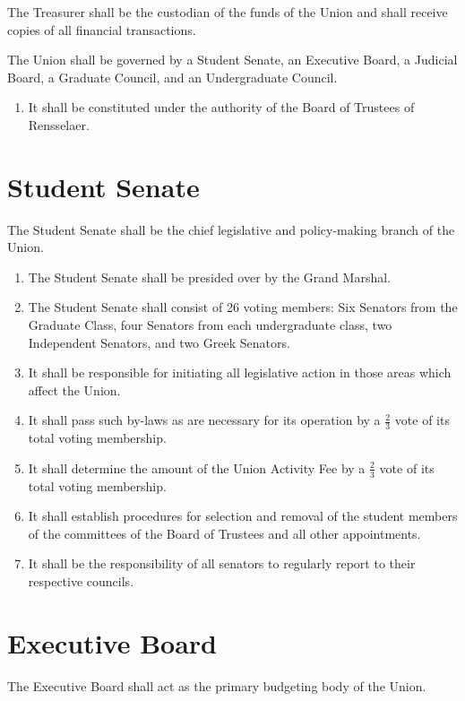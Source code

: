 \documentclass[12pt]{constitution}
\begin{document}
The Treasurer shall be the custodian of the funds of the Union and shall receive copies of all financial transactions.

The Union shall be governed by a Student Senate, an Executive Board, a Judicial Board, a Graduate
Council, and an Undergraduate Council.
\begin{enumerate}
\item It shall be constituted under the authority of the Board of Trustees of Rensselaer.
\end{enumerate}


\section{Student Senate}

The Student Senate shall be the chief legislative and policy-making branch of the Union.

\begin{enumerate}
\item The Student Senate shall be presided over by the Grand Marshal.
\item The Student Senate shall consist of 26 voting members: Six Senators from the Graduate Class, four Senators from each undergraduate class, two Independent Senators, and two Greek Senators.
\item It shall be responsible for initiating all legislative action in those areas which affect the Union.
\item It shall pass such by-laws as are necessary for its operation by a $\frac{2}{3}$ vote of its total voting membership.
\item It shall determine the amount of the Union Activity Fee by a $\frac{2}{3}$ vote of its total voting membership.
\item It shall establish procedures for selection and removal of the student members of the committees of the Board of Trustees and all other appointments.
\item It shall be the responsibility of all senators to regularly report to their respective councils.
\end{enumerate}





\section{Executive Board}

The Executive Board shall act as the primary budgeting body of the Union.
\end{document}
